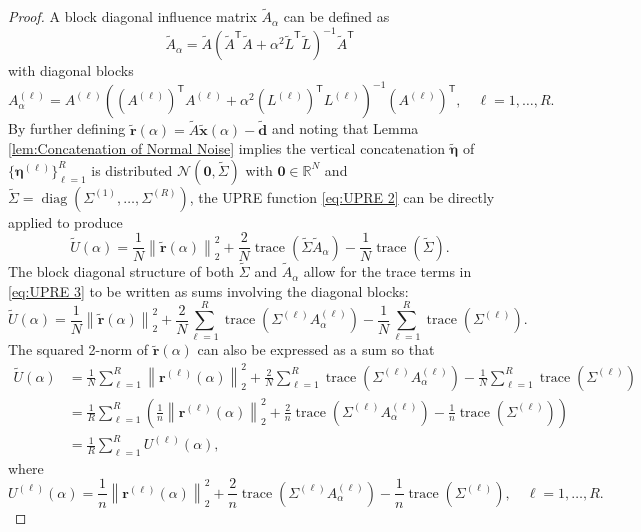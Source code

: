 \documentclass[12pt]{article}
\newcommand{\dVec}{\mathbf{d}}	%
\newcommand{\rVec}{\mathbf{r}}	%
\newcommand{\xVec}{\mathbf{x}}	%
\newcommand{\trans}[1]{{#1}^\mathsf{T}}	%
\DeclareMathOperator{\trace}{trace}		%
\DeclareMathOperator{\diag}{diag}	%
\newcommand{\regparam}{\alpha}
\newcommand{\noise}{\eta}	%
\newcommand{\noiseVec}{\bm{\noise}}	%
\newcommand{\zeroVec}{\bm{0}}	%
\newcommand{\U}{U}	%
\begin{document}
\begin{proof}
A block diagonal influence matrix $\widetilde{A}_\regparam$ can be defined as
\[\widetilde{A}_\regparam = \widetilde{A}(\trans{\widetilde{A}}\widetilde{A} + \regparam^2\trans{\widetilde{L}}\widetilde{L})^{-1}\trans{\widetilde{A}}\]
with diagonal blocks
\begin{equation}
\label{eq:Diagonal blocks}
A^{(\ell)}_\regparam = A^{(\ell)}\left(\trans{\left(A^{(\ell)}\right)}A^{(\ell)} + \regparam^2\trans{\left(L^{(\ell)}\right)}L^{(\ell)}\right)^{-1}\trans{\left(A^{(\ell)}\right)}, \quad \ell = 1,\ldots,R.
\end{equation}
By further defining $\widetilde{\rVec}(\regparam) = \widetilde{A}\widetilde{\xVec}(\regparam) - \widetilde{\dVec}$ and noting that Lemma \ref{lem:Concatenation of Normal Noise} implies the vertical concatenation $\widetilde{\noiseVec}$ of $\{\noiseVec^{(\ell)}\}_{\ell=1}^R$ is distributed $\mathcal{N}(\zeroVec,\widetilde{\Sigma})$ with $\zeroVec \in \mathbb{R}^N$ and $\widetilde{\Sigma} = \diag(\Sigma^{(1)},\ldots,\Sigma^{(R)})$, the UPRE function \eqref{eq:UPRE 2} can be directly applied to produce
\begin{equation}
\label{eq:UPRE 3}
\widetilde{\U}(\regparam) = \frac{1}{N}\left\|\widetilde{\rVec}(\regparam)\right\|_2^2 + \frac{2}{N}\trace\left(\widetilde{\Sigma}\widetilde{A}_\regparam\right) - \frac{1}{N}\trace\left(\widetilde{\Sigma}\right).
\end{equation}
The block diagonal structure of both $\widetilde{\Sigma}$ and $\widetilde{A}_\regparam$ allow for the trace terms in \eqref{eq:UPRE 3} to be written as sums involving the diagonal blocks:
\begin{equation}
\label{eq:UPRE 4}
\widetilde{\U}(\regparam) = \frac{1}{N}\left\|\widetilde{\rVec}(\regparam)\right\|_2^2 + \frac{2}{N} \sum_{\ell=1}^R \trace\left(\Sigma^{(\ell)}A^{(\ell)}_\regparam\right) - \frac{1}{N} \sum_{\ell=1}^R \trace\left(\Sigma^{(\ell)}\right).
\end{equation}
The squared 2-norm of $\widetilde{\rVec}(\regparam)$ can also be expressed as a sum so that
\begin{align*}
\widetilde{\U}(\regparam) &= \frac{1}{N} \sum_{\ell=1}^R \left\|\rVec^{(\ell)}(\regparam)\right\|_2^2 + \frac{2}{N} \sum_{\ell=1}^R \trace\left(\Sigma^{(\ell)} A_\regparam^{(\ell)}\right) - \frac{1}{N} \sum_{\ell=1}^R \trace\left(\Sigma^{(\ell)}\right) \\
&= \frac{1}{R} \sum_{\ell=1}^R \left(\frac{1}{n}\left\|\rVec^{(\ell)}(\regparam)\right\|_2^2 + \frac{2}{n} \trace\left(\Sigma^{(\ell)} A_\regparam^{(\ell)}\right) - \frac{1}{n} \trace\left(\Sigma^{(\ell)}\right)\right) \\
&= \frac{1}{R} \sum_{\ell=1}^R \U^{(\ell)}(\regparam),
\end{align*}
where
\[\U^{(\ell)}(\regparam) = \frac{1}{n}\left\|\rVec^{(\ell)}(\regparam)\right\|_2^2 + \frac{2}{n} \trace\left(\Sigma^{(\ell)} A_\regparam^{(\ell)}\right) - \frac{1}{n} \trace\left(\Sigma^{(\ell)}\right), \quad \ell = 1,\ldots,R.\]
\end{proof}
\end{document}
